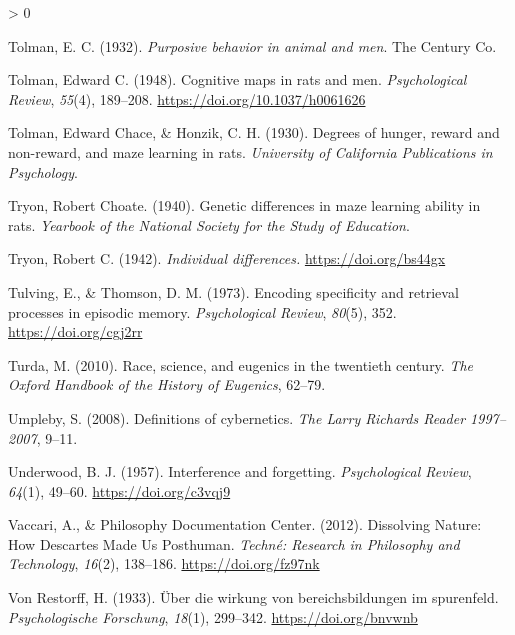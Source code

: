 \documentclass[
  oneside,
  12pt]{crumpbook}
\newlength{\cslhangindent}
\newenvironment{CSLReferences}[2] %
 {%
  \setlength{\parindent}{0pt}
  \ifodd #1 \everypar{\setlength{\hangindent}{\cslhangindent}}\ignorespaces\fi
  \ifnum #2 > 0
  \setlength{\parskip}{#2\baselineskip}
  \fi
 }%
 {}
\begin{document}
\begin{CSLReferences}{1}{0}
\leavevmode\hypertarget{ref-tolmanPurposiveBehaviorAnimal1932}{}%
Tolman, E. C. (1932). \emph{Purposive behavior in animal and men}. {The Century Co.}

\leavevmode\hypertarget{ref-tolmanCognitiveMapsRats1948}{}%
Tolman, Edward C. (1948). Cognitive maps in rats and men. \emph{Psychological Review}, \emph{55}(4), 189--208. \url{https://doi.org/10.1037/h0061626}

\leavevmode\hypertarget{ref-tolmanDegreesHungerReward1930}{}%
Tolman, Edward Chace, \& Honzik, C. H. (1930). Degrees of hunger, reward and non-reward, and maze learning in rats. \emph{University of California Publications in Psychology}.

\leavevmode\hypertarget{ref-tryonGeneticDifferencesMaze1940}{}%
Tryon, Robert Choate. (1940). Genetic differences in maze learning ability in rats. \emph{Yearbook of the National Society for the Study of Education}.

\leavevmode\hypertarget{ref-tryonIndividualDifferences1942}{}%
Tryon, Robert C. (1942). \emph{Individual differences.} \url{https://doi.org/bs44gx}

\leavevmode\hypertarget{ref-tulvingEncodingSpecificityRetrieval1973}{}%
Tulving, E., \& Thomson, D. M. (1973). Encoding specificity and retrieval processes in episodic memory. \emph{Psychological Review}, \emph{80}(5), 352. \url{https://doi.org/cgj2rr}

\leavevmode\hypertarget{ref-turdaRaceScienceEugenics2010}{}%
Turda, M. (2010). Race, science, and eugenics in the twentieth century. \emph{The Oxford Handbook of the History of Eugenics}, 62--79.

\leavevmode\hypertarget{ref-umplebyDefinitionsCybernetics2008}{}%
Umpleby, S. (2008). Definitions of cybernetics. \emph{The Larry Richards Reader 1997--2007}, 9--11.

\leavevmode\hypertarget{ref-underwoodInterferenceForgetting1957}{}%
Underwood, B. J. (1957). Interference and forgetting. \emph{Psychological Review}, \emph{64}(1), 49--60. \url{https://doi.org/c3vqj9}

\leavevmode\hypertarget{ref-vaccariDissolvingNatureHow2012}{}%
Vaccari, A., \& Philosophy Documentation Center. (2012). Dissolving {Nature}: {How Descartes Made Us Posthuman}. \emph{Techné: Research in Philosophy and Technology}, \emph{16}(2), 138--186. \url{https://doi.org/fz97nk}

\leavevmode\hypertarget{ref-vonrestorffUberWirkungBereichsbildungen1933}{}%
Von Restorff, H. (1933). Über die wirkung von bereichsbildungen im spurenfeld. \emph{Psychologische Forschung}, \emph{18}(1), 299--342. \url{https://doi.org/bnvwnb}


\end{CSLReferences}
\end{document}
